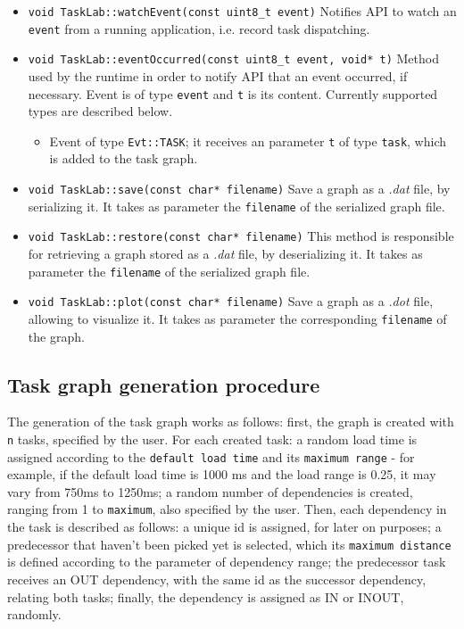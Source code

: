 \begin{itemize}
\item\texttt{void TaskLab::watchEvent(const uint8\_t event)} \newline
Notifies API to watch an \texttt{event} from a running application, i.e. record task dispatching.

\item\texttt{void TaskLab::eventOccurred(const uint8\_t event, void* t)} \newline
Method used by the runtime in order to notify API that an event occurred, if necessary. Event is of type \texttt{event} and \texttt{t} is its content. Currently supported types are described below.
\begin{itemize} 
\item Event of type \texttt{Evt::TASK}; it receives an parameter \texttt{t} of type \texttt{task}, which is added to the task graph.
\end{itemize}

\item \texttt{void TaskLab::save(const char* filename)} \newline
Save a graph as a \textit{.dat} file, by serializing it. It takes as parameter the \texttt{filename} of the serialized graph file.

\item \texttt{void TaskLab::restore(const char* filename)} \newline
This method is responsible for retrieving a graph stored as a \textit{.dat} file, by deserializing it. It takes as parameter the \texttt{filename} of the serialized graph file.

\item \texttt{void TaskLab::plot(const char* filename)} \newline
Save a graph as a \textit{.dot} file, allowing to visualize it. It takes as parameter the corresponding \texttt{filename} of the graph.
\end{itemize}

\subsection{Task graph generation procedure}
The generation of the task graph works as follows: first, the graph is created with \texttt{n} tasks, specified by the user. For each created task: a random load time is assigned according to the \texttt{default load time} and its \texttt{maximum range} - for example, if the default load time is 1000 ms and the load range is 0.25, it may vary from 750ms to 1250ms; a random number of dependencies is created, ranging from 1 to \texttt{maximum}, also specified by the user.   Then, each dependency in the task is described as follows: a unique id is assigned, for later on purposes; a predecessor that haven't been picked yet is selected, which its \texttt{maximum distance} is defined according to the parameter of dependency range; the predecessor task receives an OUT dependency, with the same id as the successor dependency, relating both tasks; finally, the dependency is assigned as IN or INOUT, randomly. 

